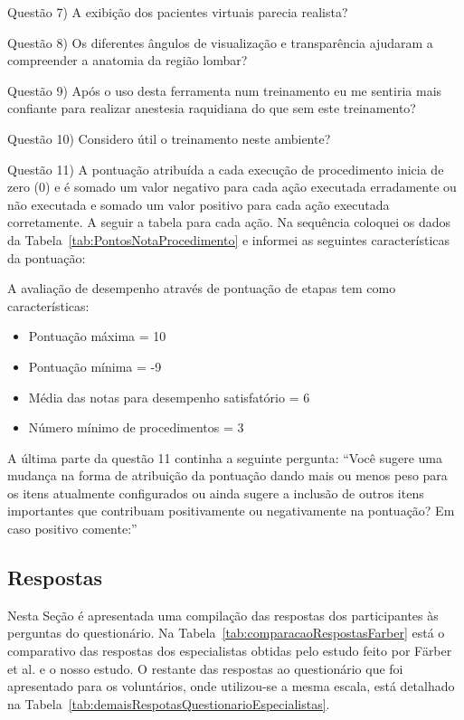 Questão 7) A exibição dos pacientes virtuais parecia realista?

Questão 8) Os diferentes ângulos de visualização e transparência ajudaram a compreender a anatomia da região lombar?

Questão 9) Após o uso desta ferramenta num treinamento eu me sentiria mais confiante para realizar anestesia raquidiana do que sem este treinamento?

Questão 10) Considero útil o treinamento neste ambiente?

Questão 11) A pontuação atribuída a cada execução de procedimento inicia de zero (0) e é somado um valor negativo para cada ação executada erradamente ou não executada e somado um valor positivo para cada ação executada corretamente. A seguir a tabela para cada ação. Na sequência coloquei os dados da Tabela~\ref{tab:PontosNotaProcedimento} e informei as seguintes características da pontuação:

A avaliação de desempenho através de pontuação de etapas tem como características:
\begin{itemize}
   \item Pontuação máxima = 10
   \item Pontuação mínima = -9
   \item Média das notas para desempenho satisfatório = 6
   \item Número mínimo de procedimentos = 3
 \end{itemize}

A última parte da questão 11 continha a seguinte pergunta:
``Você sugere uma mudança na forma de atribuição da pontuação dando mais ou menos peso para os itens atualmente configurados ou ainda sugere a inclusão de outros itens importantes que contribuam positivamente ou negativamente na pontuação? Em caso positivo comente:''

\subsection{Respostas}
\label{sec:respostasEspecialistas}

Nesta Seção é apresentada uma compilação das respostas dos participantes às perguntas do questionário. Na Tabela~\ref{tab:comparacaoRespostasFarber} está o comparativo das respostas dos especialistas obtidas pelo estudo feito por Färber et al. \cite{Farber2008} e o nosso estudo. O restante das respostas ao questionário que foi apresentado para os voluntários, onde utilizou-se a mesma escala, está detalhado na Tabela~\ref{tab:demaisRespotasQuestionarioEspecialistas}.

